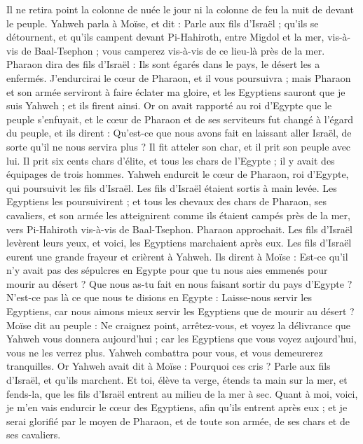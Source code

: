 \begin{multicols}{2}
Il ne retira point la colonne de nuée le jour ni la colonne de feu la nuit de devant le peuple.
\VerseOne{}Yahweh parla à Moïse, et dit :
Parle aux fils d'Israël ; qu'ils se détournent, et qu'ils campent devant Pi-Hahiroth, entre Migdol et la mer, vis-à-vis de Baal-Tsephon ; vous camperez vis-à-vis de ce lieu-là près de la mer.
Pharaon dira des fils d'Israël : Ils sont égarés dans le pays, le désert les a enfermés.
J'endurcirai le cœur de Pharaon, et il vous poursuivra ; mais Pharaon et son armée serviront à faire éclater ma gloire, et les Egyptiens sauront que je suis Yahweh ; et ils firent ainsi.
Or on avait rapporté au roi d'Egypte que le peuple s'enfuyait, et le cœur de Pharaon et de ses serviteurs fut changé à l'égard du peuple, et ils dirent : Qu'est-ce que nous avons fait en laissant aller Israël, de sorte qu'il ne nous servira plus ?
Il fit atteler son char, et il prit son peuple avec lui.
Il prit six cents chars d'élite, et tous les chars de l'Egypte ; il y avait des équipages de trois hommes.
Yahweh endurcit le cœur de Pharaon, roi d'Egypte, qui poursuivit les fils d'Israël. Les fils d'Israël étaient sortis à main levée.
Les Egyptiens les poursuivirent ; et tous les chevaux des chars de Pharaon, ses cavaliers, et son armée les atteignirent comme ils étaient campés près de la mer, vers Pi-Hahiroth vis-à-vis de Baal-Tsephon.
Pharaon approchait. Les fils d'Israël levèrent leurs yeux, et voici, les Egyptiens marchaient après eux. Les fils d'Israël eurent une grande frayeur et crièrent à Yahweh.
Ils dirent à Moïse : Est-ce qu'il n'y avait pas des sépulcres en Egypte pour que tu nous aies emmenés pour mourir au désert ? Que nous as-tu fait en nous faisant sortir du pays d'Egypte ?
N’est-ce pas là ce que nous te disions en Egypte : Laisse-nous servir les Egyptiens, car nous aimons mieux servir les Egyptiens que de mourir au désert ?
Moïse dit au peuple : Ne craignez point, arrêtez-vous, et voyez la délivrance que Yahweh vous donnera aujourd'hui ; car les Egyptiens que vous voyez aujourd'hui, vous ne les verrez plus.
Yahweh combattra pour vous, et vous demeurerez tranquilles.
Or Yahweh avait dit à Moïse : Pourquoi ces cris ? Parle aux fils d'Israël, et qu'ils marchent.
Et toi, élève ta verge, étends ta main sur la mer, et fends-la, que les fils d'Israël entrent au milieu de la mer à sec.
Quant à moi, voici, je m'en vais endurcir le cœur des Egyptiens, afin qu'ils entrent après eux ; et je serai glorifié par le moyen de Pharaon, et de toute son armée, de ses chars et de ses cavaliers.

\end{multicols}
